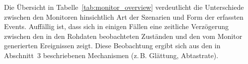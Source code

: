 Die Übersicht in Tabelle~\ref{tab:monitor_overview} verdeutlicht die
Unterschiede
zwischen den Monitoren hinsichtlich Art der Szenarien und Form der
erfassten Events.
Auffällig ist, dass sich in einigen Fällen eine zeitliche Verzögerung zwischen
den in den Rohdaten beobachteten Zuständen und den vom Monitor generierten
Ereignissen zeigt. Diese Beobachtung ergibt sich aus den in Abschnitt~3
beschriebenen
Mechanismen (z.\,B. Glättung, Abtastrate).
